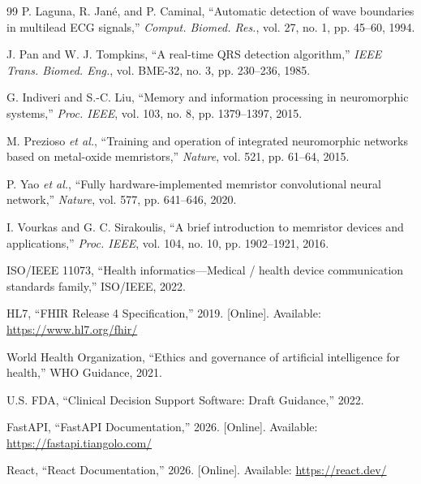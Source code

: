\documentclass[12pt,a4paper]{article}
\begin{document}
\begin{thebibliography}{99}
P. Laguna, R. Jan\'e, and P. Caminal, ``Automatic detection of wave boundaries in multilead ECG signals,'' \textit{Comput. Biomed. Res.}, vol. 27, no. 1, pp. 45--60, 1994.

J. Pan and W. J. Tompkins, ``A real-time QRS detection algorithm,'' \textit{IEEE Trans. Biomed. Eng.}, vol. BME-32, no. 3, pp. 230--236, 1985.

G. Indiveri and S.-C. Liu, ``Memory and information processing in neuromorphic systems,'' \textit{Proc. IEEE}, vol. 103, no. 8, pp. 1379--1397, 2015.

M. Prezioso \textit{et al.}, ``Training and operation of integrated neuromorphic networks based on metal-oxide memristors,'' \textit{Nature}, vol. 521, pp. 61--64, 2015.

P. Yao \textit{et al.}, ``Fully hardware-implemented memristor convolutional neural network,'' \textit{Nature}, vol. 577, pp. 641--646, 2020.

I. Vourkas and G. C. Sirakoulis, ``A brief introduction to memristor devices and applications,'' \textit{Proc. IEEE}, vol. 104, no. 10, pp. 1902--1921, 2016.

ISO/IEEE 11073, ``Health informatics---Medical / health device communication standards family,'' ISO/IEEE, 2022.

HL7, ``FHIR Release 4 Specification,'' 2019. [Online]. Available: \url{https://www.hl7.org/fhir/}

World Health Organization, ``Ethics and governance of artificial intelligence for health,'' WHO Guidance, 2021.

U.S. FDA, ``Clinical Decision Support Software: Draft Guidance,'' 2022.

FastAPI, ``FastAPI Documentation,'' 2026. [Online]. Available: \url{https://fastapi.tiangolo.com/}

React, ``React Documentation,'' 2026. [Online]. Available: \url{https://react.dev/}
\end{thebibliography}
\end{document}
